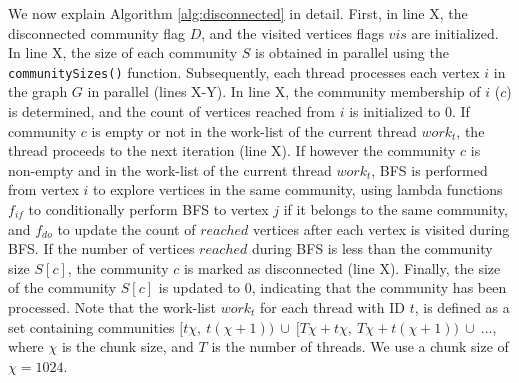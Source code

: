 We now explain Algorithm \ref{alg:disconnected} in detail. First, in line X, the disconnected community flag $D$, and the visited vertices flags $vis$ are initialized. In line X, the size of each community $S$ is obtained in parallel using the \texttt{communitySizes()} function. Subsequently, each thread processes each vertex $i$ in the graph $G$ in parallel (lines X-Y). In line X, the community membership of $i$ ($c$) is determined, and the count of vertices reached from $i$ is initialized to $0$. If community $c$ is empty or not in the work-list of the current thread $work_t$, the thread proceeds to the next iteration (line X). If however the community $c$ is non-empty and in the work-list of the current thread $work_t$, BFS is performed from vertex $i$ to explore vertices in the same community, using lambda functions $f_{if}$ to conditionally perform BFS to vertex $j$ if it belongs to the same community, and $f_{do}$ to update the count of $reached$ vertices after each vertex is visited during BFS. If the number of vertices $reached$ during BFS is less than the community size $S[c]$, the community $c$ is marked as disconnected (line X). Finally, the size of the community $S[c]$ is updated to $0$, indicating that the community has been processed. Note that the work-list $work_t$ for each thread with ID $t$, is defined as a set containing communities $[t\chi,\ t(\chi+1))\ \cup\ [T\chi + t\chi,\ T\chi + t(\chi+1))\ \cup\ \ldots$, where $\chi$ is the chunk size, and $T$ is the number of threads. We use a chunk size of $\chi = 1024$.
